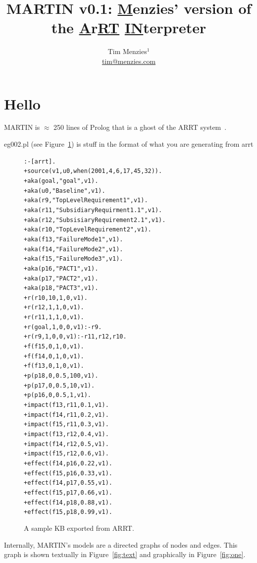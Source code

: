 \documentclass[10pt]{article}
\title{MARTIN v0.1: \underline{M}enzies' version of the
\underline{A}r\underline{RT} \underline{IN}terpreter}
\author{Tim Menzies$^1$\\{ \url{tim@menzies.com}}}
\newcommand{\fig}[1]{Figure~\ref{fig:#1}}
\begin{document}
\maketitle


 \section{Hello} MARTIN is $\approx$ 250 lines of Prolog
that is a ghost of the ARRT system~\cite{fea01}.


eg002.pl (see \fig{eg}) is stuff in the format of what you are generating from
arrt
\begin{figure}
 {\small
\begin{alltt}:- [arrt].
+source(v1,u0,when(2001,4,6,17,45,32)).
+aka(goal,"goal",v1).
+aka(u0,"Baseline",v1).
+aka(r9,"Top Level Requirement 1",v1).
+aka(r11,"Subsidiary Requirment 1.1",v1).
+aka(r12,"Subsisiary Requirement 2.1",v1).
+aka(r10,"Top Level Requirement 2",v1).
+aka(f13,"Failure Mode 1",v1).
+aka(f14,"Failure Mode 2",v1).
+aka(f15,"Failure Mode 3",v1).
+aka(p16,"PACT 1",v1).
+aka(p17,"PACT 2",v1).
+aka(p18,"PACT 3",v1).
+r(r10,10,1,0,v1).
+r(r12,1,1,0,v1).
+r(r11,1,1,0,v1).
+r(goal,1,0,0,v1) :- r9.
+r(r9,  1,0,0,v1) :- r11,r12,r10.
+f(f15,0,1,0,v1).
+f(f14,0,1,0,v1).
+f(f13,0,1,0,v1).
+p(p18,0,0.5,100,v1).
+p(p17,0,0.5,10,v1).
+p(p16,0,0.5,1,v1).
+impact(f13,r11,0.1,v1).
+impact(f14,r11,0.2,v1).
+impact(f15,r11,0.3,v1).
+impact(f13,r12,0.4,v1).
+impact(f14,r12,0.5,v1).
+impact(f15,r12,0.6,v1).
+effect(f14,p16,0.22,v1).
+effect(f15,p16,0.33,v1).
+effect(f14,p17,0.55,v1).
+effect(f15,p17,0.66,v1).
+effect(f14,p18,0.88,v1).
+effect(f15,p18,0.99,v1).
\end{alltt}}
\caption{A sample KB exported from ARRT.}\label{fig:eg}
\end{figure}

Internally, MARTIN's models are a directed graphs of nodes and
edges. This graph is shown  textually in \fig{text} and graphically in \fig{one}.
\end{document}
